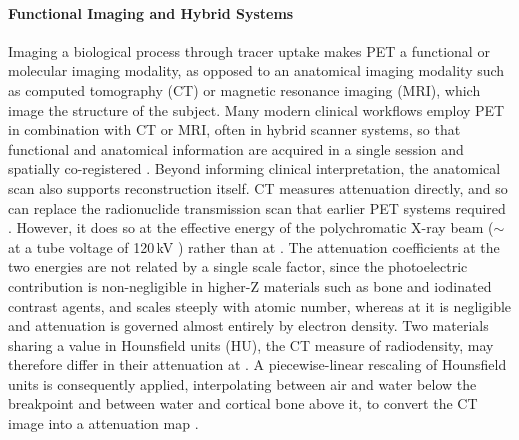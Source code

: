 \paragraph{Functional Imaging and Hybrid Systems}
Imaging a biological process through tracer uptake makes PET a functional or molecular imaging modality, as opposed to an anatomical imaging modality such as computed tomography (CT) or magnetic resonance imaging (MRI), which image the structure of the subject.
Many modern clinical workflows employ PET in combination with CT or MRI, often in hybrid scanner systems, so that functional and anatomical information are acquired in a single session and spatially co-registered .
Beyond informing clinical interpretation, the anatomical scan also supports reconstruction itself.
CT measures attenuation directly, and so can replace the radionuclide transmission scan that earlier PET systems required \cite{Kinahan1998}. However, it does so at the effective energy of the polychromatic X-ray beam ($\sim$ at a tube voltage of 120\,kV ) rather than at .
The attenuation coefficients at the two energies are not related by a single scale factor, since the photoelectric contribution is non-negligible in higher-Z materials such as bone and iodinated contrast agents, and scales steeply with atomic number, whereas at  it is negligible and attenuation is governed almost entirely by electron density.
Two materials sharing a value in Hounsfield units (HU), the CT measure of radiodensity, may therefore differ in their attenuation at .
A piecewise-linear rescaling of Hounsfield units is consequently applied, interpolating between air and water below the breakpoint and between water and cortical bone above it, to convert the CT image into a  attenuation map \cite{Burger2002,Carney2006}.

